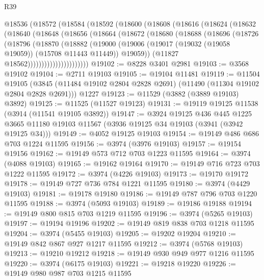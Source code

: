 \begin{lexlean}{R39}
\begin{coremodule}
    @18536
      (@18572
        (@18584
          (@18592
            (@18600
              (@18608
                (@18616
                  (@18624
                    (@18632
                      (@18640
                        (@18648
                          (@18656
                            (@18664
                              (@18672
                                (@18680
                                  (@18688
                                    (@18696
                                      (@18726
                                        (@18796
                                          (@18870
                                            (@18882
                                              (@19000
                                                (@19006
                                                  (@19017
                                                    (@19032 (@19058 @19059))
                                                    (@15708 @11443 @11449))
                                                  @19059))
                                              (@11827 @18562))))))))))))))))))))))
@19102 := @8228 @3401 @2981
@19103 := @3568 @19102
@19104 := @2711 @19103
@19105 := @19104 @11481
@19119 := @11504
    @19105
    (@3845 (@11484 @19102 @2804 @2828 @2691) (@11490 (@11304 @19102 @2804 @2828 @2691)))
    @1227
@19123 := @11529 (@3882 (@3889 @19103) @3892)
@19125 := @11525 (@11527 @19123)
@19131 := @19119 @19125 @11538 (@3914 (@11541 @19105 @3892))
@19147 := @3924
    @19125
    @436
    @445
    @1225
    @3665
    @11180
    @19103
    @11567
    (@3936 @19125 @34 @19103 (@3941 (@3942 @19125 @34)))
@19149 := @4052 @19125 @19103
@19154 := @19149 @486 @686 @703 @1224 @11595
@19156 := @3974 (@3976 @19103)
@19157 := @19154 @19156
@19162 := @19149 @573 @712 @703 @1223 @11595
@19164 := @3974 (@4088 @19103)
@19165 := @19162 @19164
@19170 := @19149 @716 @723 @703 @1222 @11595
@19172 := @3974 (@4226 @19103)
@19173 := @19170 @19172
@19178 := @19149 @727 @736 @784 @1221 @11595
@19180 := @3974 (@4429 @19103)
@19181 := @19178 @19180
@19186 := @19149 @787 @796 @703 @1220 @11595
@19188 := @3974 (@5093 @19103)
@19189 := @19186 @19188
@19194 := @19149 @800 @815 @703 @1219 @11595
@19196 := @3974 (@5265 @19103)
@19197 := @19194 @19196
@19202 := @19149 @819 @838 @703 @1218 @11595
@19204 := @3974 (@5455 @19103)
@19205 := @19202 @19204
@19210 := @19149 @842 @867 @927 @1217 @11595
@19212 := @3974 (@5768 @19103)
@19213 := @19210 @19212
@19218 := @19149 @930 @949 @977 @1216 @11595
@19220 := @3974 (@6175 @19103)
@19221 := @19218 @19220
@19226 := @19149 @980 @987 @703 @1215 @11595

\end{coremodule}
\end{lexlean}
